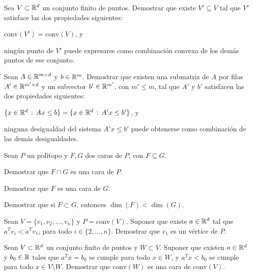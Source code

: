 \documentclass[a4paper,12pt]{article}
\renewcommand{\conv}[1]{\mathrm{conv}\left(#1\right)}
\begin{document}

\begin{exerciselist}
  \item Sea $V \subset \mathbb{R}^d$ un conjunto finito de puntos. Demostrar que existe $V' \subseteq V$ tal que $V'$ satisface las dos propiedades siguientes:
  \begin{exerciselist}
    \item $\conv{V'} = \conv{V}$, y
    \item ningún punto de $V'$ puede expresarse como combinación convexa de los demás puntos de ese conjunto.
  \end{exerciselist}

  \item Sean $A \in \mathbb{R}^{m \times d}$ y $b \in \mathbb{R}^m$. Demostrar que existen una submatriz de $A$ por filas $A' \in \mathbb{R}^{m' \times d}$ y un subvector $b' \in \mathbb{R}^{m'}$, con $m' \leq m$, tal que $A'$ y $b'$ satisfacen las dos propiedades siguientes:
  \begin{exerciselist}
    \item $\{ x \in \mathbb{R}^d \, : \, Ax \leq b \} = \{ x \in \mathbb{R}^d \, : \, A'x \leq b'\}$, y
    \item ninguna desigualdad del sistema $A'x \leq b'$ puede obtenerse como combinación de las demás desigualdades.
  \end{exerciselist}

  \item Sean $P$ un polítopo y $F, G$ dos caras de $P$, con $F \subseteq G$.
  \begin{exerciselist}
    \item Demostrar que $F \cap G$ es una cara de $P$.
    \item Demostrar que $F$ es una cara de $G$.
    \item Demostrar que si $F \subset G$, entonces $\dim(F) < \dim(G)$.
  \end{exerciselist}

\item Sean $V = \{v_1, v_2, \ldots, v_n\}$ y $P = \conv{V}$. Suponer que existe $a \in \mathbb{R}^d$ tal que
$a^T v_i < a^T v_1$, para todo $i \in \{2, \ldots, n\}$. Demostrar que $v_1$ es un vértice de $P$.

\item Sean $V \subset \mathbb{R}^d$ un conjunto finito de puntos y $W \subset V$. Suponer que existen $a \in \mathbb{R}^d$ y $b_0 \in \mathbb{R}$ tales que $a^T x = b_0$ se cumple para todo $x \in W$, y $a^T x < b_0$ se cumple para todo $x \in V \setminus W$. Demostrar que $\conv{W}$ es una cara de $\conv{V}$.


\end{exerciselist}
\end{document}

